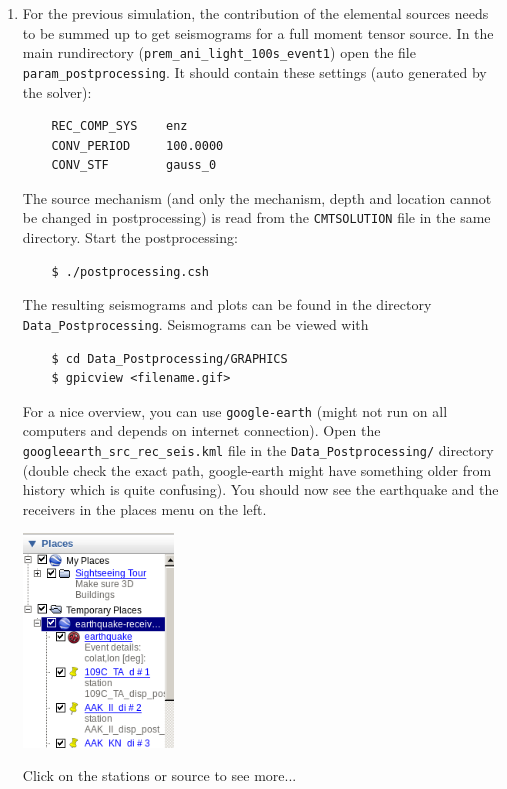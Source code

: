 \documentclass{article}
\begin{document}
\begin{enumerate}
    \item For the previous simulation, the contribution of the elemental sources needs
    to be summed up to get seismograms for a full moment tensor source. In the
    main rundirectory (\verb|prem_ani_light_100s_event1|) open the file
    \verb|param_postprocessing|. It should contain these settings (auto generated by the
    solver):
    \begin{verbatim}
    REC_COMP_SYS    enz
    CONV_PERIOD     100.0000
    CONV_STF        gauss_0
    \end{verbatim}
    The source mechanism (and only the mechanism, depth and location cannot be changed
    in postprocessing) is read from the \verb|CMTSOLUTION| file in the same directory.
    Start the postprocessing:
    \begin{verbatim}
    $ ./postprocessing.csh
    \end{verbatim}
    The resulting seismograms and plots can be found in the directory 
    \verb|Data_Postprocessing|. Seismograms can be viewed with
    \begin{verbatim}
    $ cd Data_Postprocessing/GRAPHICS
    $ gpicview <filename.gif>
    \end{verbatim}
    For a nice overview, you can use \verb|google-earth| (might not run on all computers
    and depends on internet connection). Open the \verb|googleearth_src_rec_seis.kml| file
    in the \verb|Data_Postprocessing/| directory (double check the exact path,
    google-earth might have something older from history which is quite confusing).
    You should now see the earthquake and the receivers in the places menu on the left.
    
    \begin{center}
    \includegraphics[width=40mm]{google-earth.png}
    \end{center}

    Click on the stations or source to see more...

\end{enumerate}
\end{document}
